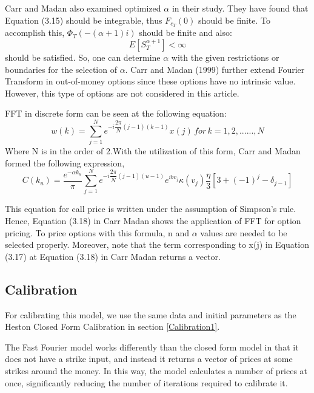 \documentclass[fontsize=12pt]{article}
\numberwithin{equation}{section} %
\numberwithin{figure}{section} %
\numberwithin{table}{section} %
\begin{document}
	Carr and Madan also examined optimized $\alpha$ in their study. They have found that Equation (3.15) should be integrable, thus $F_{c_T}(0)$ should be finite. To accomplish this, $\Phi_T(-(\alpha+1)i)$ should be finite and also:
\begin{equation}
E[S^{\alpha+1}_T]<\infty
\end{equation}
should be satisfied. So, one can determine $\alpha$  with the given restrictions or boundaries for the selection of $\alpha$. Carr and Madan (1999) further extend Fourier Transform in out-of-money options since these options have no intrinsic value. However, this type of options are not considered in this article.

FFT in discrete form can be seen at the following equation:
\begin{equation}
w(k)=\sum^N_{j=1}e^{-i\dfrac{2\pi}{N}(j-1)(k-1)}x(j) \, for \, k=1,2,......,N
\end{equation}
Where N is in the order of 2.With the utilization of this form, Carr and Madan formed the following expression,
\begin{equation}
C(k_u)=\dfrac{e^{-\alpha k_u}}{\pi}\sum^N_{j=1}e^{-i\dfrac{2\pi}{N}(j-1)(u-1)}e^{ibv_j}\kappa(v_j)\dfrac{\eta}{3}[3+(-1)^j-\delta_{j-1}]
\end{equation}

This equation for call price is written under the assumption of Simpson's rule. Hence, Equation (3.18) in Carr Madan shows the application of FFT for option pricing. To price options with this formula, n and $\alpha$ values are needed to be selected properly. Moreover, note that the term corresponding to x(j) in Equation (3.17) at Equation (3.18) in Carr Madan returns a vector.


\subsection{Calibration} \label{Calibration2}

For calibrating this model, we use the same data and initial parameters as the Heston Closed Form Calibration in section \ref{Calibration1}.

The Fast Fourier model works differently than the closed form model in that it does not have a strike input, and instead it returns a vector of prices at some strikes around the money. In this way, the model calculates a number of prices at once, significantly reducing the number of iterations required to calibrate it.
\end{document}
